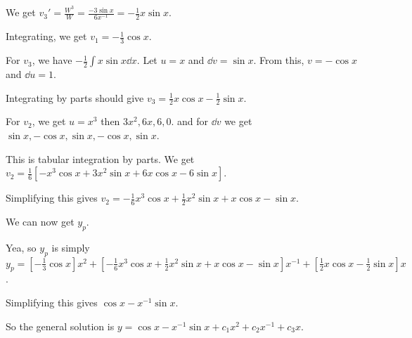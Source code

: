 \documentclass[../diffeq.tex]{subfiles}
\begin{document}
\begin{example}
    We get $v_3'=\frac{W^3}{W}=\frac{-3\sin x}{6x^{-1}}=-\frac{1}{2}x\sin x$.

    Integrating, we get $v_1=-\frac{1}{3}\cos x$.

    For $v_3$, we have $-\frac{1}{2}\int x\sin x \dd x$. Let $u=x$ and $\dd v=\sin x$. From this, $v = -\cos x$ and $\dd u = 1$.

    Integrating by parts should give $v_3=\frac{1}{2}x\cos x-\frac{1}{2}\sin x$.

    For $v_2$, we get $u=x^3$ then $3x^2,6x,6,0$. and for $\dd v$ we get $\sin x, -\cos x, \sin x, -\cos x,\sin x$.

    This is tabular integration by parts. We get $v_2=\frac{1}{6}[-x^3\cos x+3x^2\sin x+6x\cos x-6\sin x]$.

    Simplifying this gives $v_2=-\frac{1}{6}x^3\cos x+\frac{1}{2}x^2\sin x+x\cos x-\sin x$.

    We can now get $y_p$. 

    Yea, so $y_p$ is simply $y_p=[-\frac{1}{3}\cos x]x^2+[-\frac{1}{6}x^3\cos x+\frac{1}{2}x^2\sin x+x\cos x-\sin x]x^{-1}+[\frac{1}{2}x\cos x-\frac{1}{2}\sin x]x$.

    Simplifying this gives $\cos x-x^{-1}\sin x$.

    So the general solution is $y=\cos x-x^{-1}\sin x+c_1x^2+c_2x^{-1}+c_3x$.
\end{example}
\end{document}
